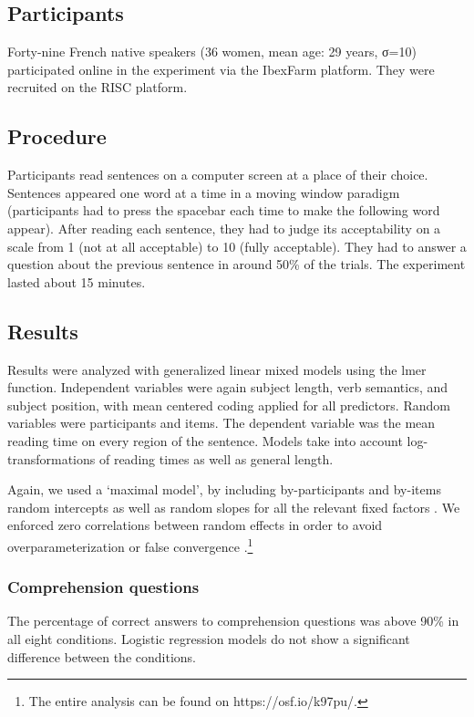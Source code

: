 \documentclass[output=paper]{langscibook}
\begin{document}
\subsection{Participants}
Forty-nine French native speakers (36 women, mean age: 29 years, σ=10) participated online in the experiment via the IbexFarm platform. They were recruited on the RISC platform.

\subsection{Procedure}
Participants read sentences on a computer screen at a place of their choice. Sentences appeared one word at a time in a moving window paradigm (participants had to press the spacebar each time to make the following word appear). After reading each sentence, they had to judge its acceptability on a scale from 1 (not at all acceptable) to 10 (fully acceptable). They had to answer a question about the previous sentence in around 50\% of the trials. The experiment lasted about 15 minutes.


\subsection{Results}
Results were analyzed with generalized linear mixed models using the lmer function. Independent variables were again subject length, verb semantics, and subject position, with mean centered coding applied for all predictors. Random variables were participants and items. The dependent variable was the mean reading time on every region of the sentence. Models take into account log-transforma\-tions of reading times as well as general length. 

Again, we used a `maximal model’, by including by-participants and by-items random intercepts as well as random slopes for all the relevant fixed factors \citep{barr2013}. We enforced zero correlations between random effects in order to avoid overparameterization or false convergence \citep{Bates2015}.\footnote{The entire analysis can be found on https://osf.io/k97pu/.} 

\subsubsection{Comprehension questions}
The percentage of correct answers to comprehension questions was above 90\% in all eight conditions. Logistic regression models do not show a significant difference between the conditions.
\end{document}
